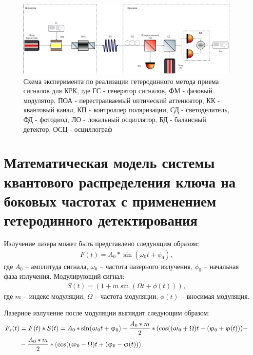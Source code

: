 \begin{figure}
    \centering
    \includegraphics[width = \linewidth]{images/Гетеродин схема новая2 .png}
    \caption{Схема эксперимента по реализации гетеродинного метода приема сигналов для КРК, где ГС - генератор сигналов, ФМ - фазовый модулятор, ПОА - перестраиваемый оптический аттенюатор, КК - квантовый канал, КП - контроллер поляризации, СД - светоделитель, ФД - фотодиод, ЛО - локальный осциллятор, БД - балансный детектор, ОСЦ - осциллограф}
    \label{fig:het true ch3}
\end{figure}
\section{Математическая модель системы квантового распределения ключа на боковых частотах с применением гетеродинного детектирования}\label{sec:ch3/sect3}
Излучение лазера может быть представлено следующим образом:
\begin{align}
F(t) = A_0 * \sin(\omega_0 t + \phi_0),
\end{align}
где $A_0$ -- амплитуда сигнала, $\omega_0$ -- частота лазерного излучения, $\phi_0$ -- начальная фаза излучения.
Модулирующий сигнал:
\begin{align}
S(t) = (1+ m\sin(\Omega t  + \phi (t))),
\end{align} 
где $m$ -- индекс модуляции, $\Omega$ -- частота модуляции, $\phi (t)$ -- вносимая модуляция.

Лазерное излучение после модуляции выглядит следующим образом:
\begin{align}
\label{eq:laser_het}
F_s(t) &= F(t) * S(t) = A_0 * \sin(\omega_0 t + \phi_0) + \frac{A_0 * m}{2} * (\cos((\omega_0 + \Omega)t + (\phi_0 + \phi (t))) - \notag \\
&- \frac{A_0 * m}{2} * (\cos((\omega_0 - \Omega)t + (\phi_0 - \phi (t))),
\end{align}

